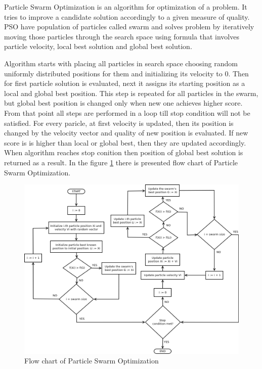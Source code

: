 Particle Swarm Optimization is an algorithm for optimization of a problem. It tries to improve a candidate solution 
accordingly to a given measure of quality. PSO have population of particles called swarm and solves problem by iteratively moving those particles 
through the search space using formula that involves particle velocity, local best solution and global best solution. 

Algorithm starts with placing all particles in search space choosing random uniformly distributed positions for them and initializing its velocity to 0. 
Then for first particle solution is evaluated, next it assigns its starting position as a local and global best position. 
This step is repeated for all particles in the swarm, but global best position is changed only when new one achieves higher score. 
From that point all steps are performed in a loop till stop condition will not be satisfied. For every paricle, at first 
velocity is updated, then its position is changed by the velocity vector and quality of new position is evaluated. 
If new score is is higher than local or global best, then they are updated accordingly. When algorithm reaches stop conition 
then position of global best solution is returned as a result.
In the figure \ref{pso_flowchart} there is presented flow chart of Particle Swarm Optimization.
\begin{figure}[ht]
    \centering
    \includegraphics[scale=0.4]{img/pso_flowchart.png}
    \caption{Flow chart of Particle Swarm Optimization}
    \label{pso_flowchart}
\end{figure}

